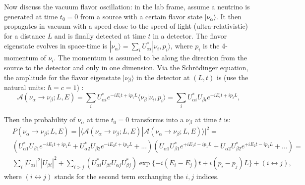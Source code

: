 Now discuss the vacuum flavor oscillation: in the lab frame, assume a neutrino is generated at time $t_0=0$ from a source with a certain flavor state $|\nu_\alpha\rangle$. It then propagates in vacuum with a speed close to the speed of light (ultra-relativistic) for a distance $L$ and is finally detected at time $t$ in a detector. The flavor eigenstate evolves in space-time is $|\nu_\alpha \rangle = \sum_i U^*_{\alpha i}|\nu_i,p_i\rangle$, where $p_i$ is the 4-momentum of $\nu_i$. The momentum is assumed to be along the direction from the source to the detector and only in one dimension. Via the Schr\"{o}dinger equation, the amplitude for the flavor eigenstate $|\nu_\beta\rangle$ in the detector at $(L,t)$ is (use the natural units: $\hbar=c=1$) \cite{aitchison2012gauge}:
\begin{equation}
\mathcal{A}(\nu_\alpha\to\nu_\beta;L,E)=\sum_{i}U^*_{\alpha i}e^{-iE_i t+ip_iL}\langle\nu_\beta|\nu_i,p_i\rangle=\sum_{i}U^*_{\alpha i}U_{\beta i}e^{-iE_it+ip_iL},
\end{equation}

Then the probability of $\nu_\alpha$ at time $t_0=0$ transforms into a $\nu_\beta$ at time $t$ is:
\begin{equation}\label{oscillationEq1}
 \begin{split}
&P(\nu_\alpha\to\nu_\beta;L,E)=|\langle\mathcal{A}(\nu_\alpha\to\nu_\beta;L,E)|\mathcal{A}(\nu_\alpha\to\nu_\beta;L,E)\rangle|^2=\\
&(U^*_{\alpha 1}U_{\beta 1}e^{-iE_1t+ip_1L}+U^*_{\alpha 2}U_{\beta 2}e^{-iE_2t+ip_2L}+...)(U_{\alpha 1}U^*_{\beta 1}e^{+iE_1t-ip_1L}+U_{\alpha 2}U^*_{\beta 2}e^{+iE_2t-ip_2L}+...)=\\
&\sum_i |U_{\alpha i}|^2|U_{\beta i}|^2 + \sum_{i>j}(U^*_{\alpha i}U_{\beta i}U_{\alpha j}U^*_{\beta j})\exp\{-i(E_i-E_j)t+i(p_i-p_j)L\}+(i\leftrightarrow j),
\end{split}
\end{equation}
where $(i\leftrightarrow j)$ stands for the second term exchanging the $i,j$ indices.

